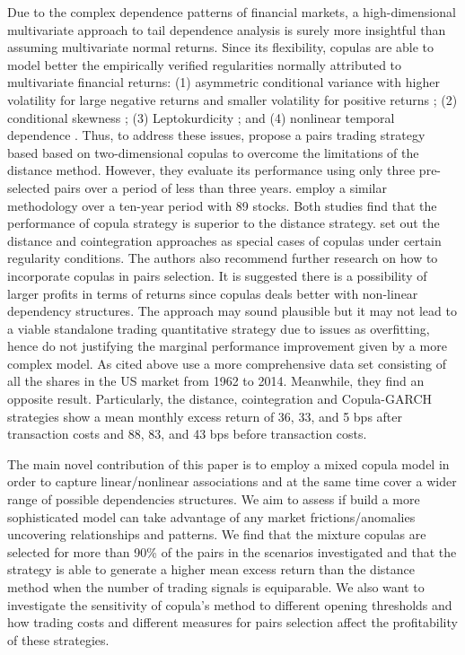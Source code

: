 \documentclass[a4paper]{article}
\begin{document}
Due to the complex dependence patterns of financial markets, a high-dimensional multivariate approach to tail dependence analysis is surely more insightful than assuming multivariate normal returns. Since its flexibility, copulas are able to model better the empirically verified regularities normally attributed to multivariate financial returns: (1) asymmetric conditional variance with higher volatility for large negative returns and smaller volatility for positive returns \citep{h98}; (2) conditional skewness \citep{ait01,chen01,patton01}; (3) Leptokurdicity \citep{t01,andreou01}; and (4) nonlinear temporal dependence \citep{cont01,campbell97}. Thus, to address these issues, \citet*{lw13} propose a pairs trading strategy based based on two-dimensional copulas to overcome the limitations of the distance method. However, they evaluate its performance using only three pre-selected pairs over a period of less than three years. \citet*{xie14} employ a similar methodology over a ten-year period with 89 stocks. Both studies find that the performance of copula strategy is superior to the distance strategy. \citet*{xw13} set out the distance and cointegration approaches as special cases of copulas under certain regularity conditions. The authors also recommend further research on how to incorporate copulas in pairs selection. It is suggested there is a possibility of larger profits in terms of returns since copulas deals better with non-linear dependency structures. The approach may sound plausible but it may not lead to a viable standalone trading quantitative strategy due to issues as overfitting, hence do not justifying the marginal performance improvement given by a more complex model. As cited above \citet*{rf15} use a more comprehensive data set consisting of all the shares in the US market from 1962 to 2014. Meanwhile, they find an opposite result. Particularly, the distance, cointegration and Copula-GARCH strategies show a mean monthly excess return of 36, 33, and 5 bps after transaction costs and 88, 83, and 43 bps before transaction costs.

The main novel contribution of this paper is to employ a mixed copula model in order to capture linear/nonlinear associations and at the same time cover a wider range of possible dependencies structures. We aim to assess if build a more sophisticated model can take advantage of any market frictions/anomalies uncovering relationships and patterns. We find that the mixture copulas are selected for more than 90\% of the pairs in the scenarios investigated and that the strategy is able 
to generate a higher mean excess return than the distance method when the 
number of trading signals is equiparable. We also want to investigate the sensitivity of copula's method to different opening thresholds and how trading costs and different measures for pairs selection affect the profitability of these strategies.
\end{document}
